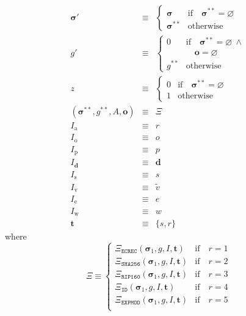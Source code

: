 \documentclass[9pt,oneside]{amsart}
\begin{document}
\begin{multicols}{2}
\begin{eqnarray}
\boldsymbol{\sigma}' & \equiv & \begin{cases}
\boldsymbol{\sigma} & \text{if} \quad \boldsymbol{\sigma}^{**} = \varnothing \\
\boldsymbol{\sigma}^{**} & \text{otherwise}
\end{cases} \\
g' & \equiv & \begin{cases}
0 & \text{if} \quad \boldsymbol{\sigma}^{**} = \varnothing \ \wedge \\
&\quad \mathbf{o} = \varnothing \\
g^{**} & \text{otherwise}
\end{cases} \\ \nonumber
z & \equiv & \begin{cases}
0 & \text{if} \quad \boldsymbol{\sigma}^{**} = \varnothing \\
1 & \text{otherwise}
\end{cases} \\
(\boldsymbol{\sigma}^{**}, g^{**},A, \mathbf{o}) & \equiv & \Xi\\
I_{\mathrm{a}} & \equiv & r \\
I_{\mathrm{o}} & \equiv & o \\
I_{\mathrm{p}} & \equiv & p \\
I_{\mathbf{d}} & \equiv & \mathbf{d} \\
I_{\mathrm{s}} & \equiv & s \\
I_{\mathrm{v}} & \equiv & \tilde{v} \\
I_{\mathrm{e}} & \equiv & e \\
I_{\mathrm{w}} & \equiv & w \\
\mathbf{t} & \equiv & \{s, r\}
\end{eqnarray}
\nopagebreak[1]where
\begin{equation}
\Xi \equiv \begin{cases}
\Xi_{\mathtt{ECREC}}(\boldsymbol{\sigma}_1, g, I, \mathbf{t}) & \text{if} \quad r = 1 \\
\Xi_{\mathtt{SHA256}}(\boldsymbol{\sigma}_1, g, I, \mathbf{t}) & \text{if} \quad r = 2 \\
\Xi_{\mathtt{RIP160}}(\boldsymbol{\sigma}_1, g, I, \mathbf{t}) & \text{if} \quad r = 3 \\
\Xi_{\mathtt{ID}}(\boldsymbol{\sigma}_1, g, I, \mathbf{t}) & \text{if} \quad r = 4 \\
\Xi_{\mathtt{EXPMOD}}(\boldsymbol{\sigma}_1, g, I, \mathbf{t}) & \text{if} \quad r = 5 \\

\end{cases}
\end{equation}
\end{multicols}
\end{document}
